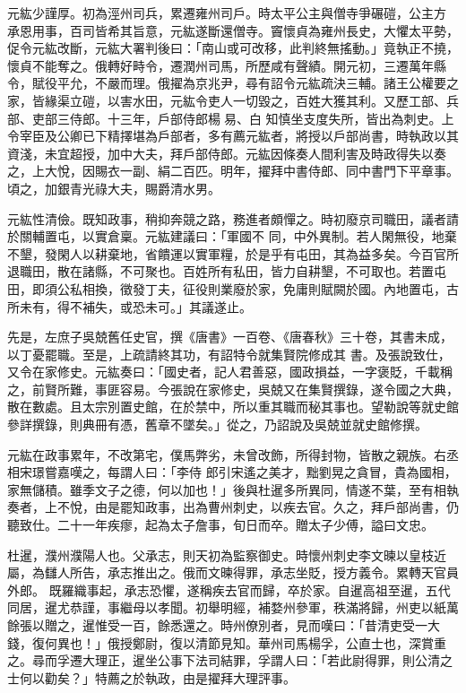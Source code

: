 \begin{pinyinscope}
 元紘少謹厚。初為涇州司兵，累遷雍州司戶。時太平公主與僧寺爭碾磑，公主方
 承恩用事，百司皆希其旨意，元紘遂斷還僧寺。竇懷貞為雍州長史，大懼太平勢，促令元紘改斷，元紘大署判後曰：「南山或可改移，此判終無搖動。」竟執正不撓，懷貞不能奪之。俄轉好畤令，遷潤州司馬，所歷咸有聲績。開元初，三遷萬年縣令，賦役平允，不嚴而理。俄擢為京兆尹，尋有詔令元紘疏決三輔。諸王公權要之家，皆緣渠立磑，以害水田，元紘令吏人一切毀之，百姓大獲其利。又歷工部、兵部、吏部三侍郎。十三年，戶部侍郎楊易、白
 知慎坐支度失所，皆出為刺史。上令宰臣及公卿已下精擇堪為戶部者，多有薦元紘者，將授以戶部尚書，時執政以其資淺，未宜超授，加中大夫，拜戶部侍郎。元紘因條奏人間利害及時政得失以奏之，上大悅，因賜衣一副、絹二百匹。明年，擢拜中書侍郎、同中書門下平章事。頃之，加銀青光祿大夫，賜爵清水男。



 元紘性清儉。既知政事，稍抑奔競之路，務進者頗憚之。時初廢京司職田，議者請於關輔置屯，以實倉稟。元紘建議曰：「軍國不
 同，中外異制。若人閑無役，地棄不墾，發閑人以耕棄地，省饋運以實軍糧，於是乎有屯田，其為益多矣。今百官所退職田，散在諸縣，不可聚也。百姓所有私田，皆力自耕墾，不可取也。若置屯田，即須公私相換，徵發丁夫，征役則業廢於家，免庸則賦闕於國。內地置屯，古所未有，得不補失，或恐未可。」其議遂止。



 先是，左庶子吳兢舊任史官，撰《唐書》一百卷、《唐春秋》三十卷，其書未成，以丁憂罷職。至是，上疏請終其功，有詔特令就集賢院修成其
 書。及張說致仕，又令在家修史。元紘奏曰：「國史者，記人君善惡，國政損益，一字褒貶，千載稱之，前賢所難，事匪容易。今張說在家修史，吳兢又在集賢撰錄，遂令國之大典，散在數處。且太宗別置史館，在於禁中，所以重其職而秘其事也。望勒說等就史館參詳撰錄，則典冊有憑，舊章不墜矣。」從之，乃詔說及吳兢並就史館修撰。



 元紘在政事累年，不改第宅，僕馬弊劣，未曾改飾，所得封物，皆散之親族。右丞相宋璟嘗嘉嘆之，每謂人曰：「李侍
 郎引宋遙之美才，黜劉晃之貪冒，貴為國相，家無儲積。雖季文子之德，何以加也！」後與杜暹多所異同，情遂不葉，至有相執奏者，上不悅，由是罷知政事，出為曹州刺史，以疾去官。久之，拜戶部尚書，仍聽致仕。二十一年疾瘳，起為太子詹事，旬日而卒。贈太子少傅，謚曰文忠。



 杜暹，濮州濮陽人也。父承志，則天初為監察御史。時懷州刺史李文暕以皇枝近屬，為讎人所告，承志推出之。俄而文暕得罪，承志坐貶，授方義令。累轉天官員外郎。
 既羅織事起，承志恐懼，遂稱疾去官而歸，卒於家。自暹高祖至暹，五代同居，暹尤恭謹，事繼母以孝聞。初舉明經，補婺州參軍，秩滿將歸，州吏以紙萬餘張以贈之，暹惟受一百，餘悉還之。時州僚別者，見而嘆曰：「昔清吏受一大錢，復何異也！」俄授鄭尉，復以清節見知。華州司馬楊孚，公直士也，深賞重之。尋而孚遷大理正，暹坐公事下法司結罪，孚謂人曰：「若此尉得罪，則公清之士何以勸矣？」特薦之於執政，由是擢拜大理評事。




\end{pinyinscope}
